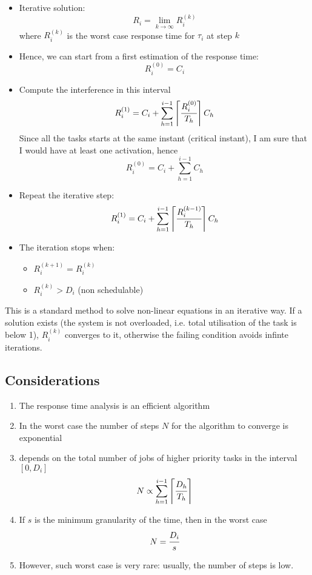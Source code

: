 \begin{itemize}
\item Iterative solution:
\[R_i = \lim_{k\to\infty} R_i^{(k)}\]
where $R_i^{(k)}$ is the worst case response time for $\tau_i$ at step $k$
\item Hence, we can start from a first estimation of the response time:
\[R_{i}^{(0)} = C_i\]
\item Compute the interference in this interval
\[R_{i}^{(1)} = C_i + \sum_{h=1}^{i-1}\left\lceil \cfrac{R_{i}^{(0)}}{T_h} \right\rceil C_h\]
Since all the tasks starts at the same instant (critical instant), I am sure that I would have at least one activation, hence
\[R_i^{(0)} = C_i + \sum_{h=1}^{i-1} C_h\]
\item Repeat the iterative step:
\[R_{i}^{(1)} = C_i + \sum_{h=1}^{i-1}\left\lceil \cfrac{R_{i}^{(k-1)}}{T_h} \right\rceil C_h\]
\item The iteration stops when:
\begin{itemize}
\item $R_i^{(k+1)} = R_i^{(k)}$
\item $R_i^{(k)} > D_i$ (non schedulable)
\end{itemize}
\end{itemize}

This is a standard method to solve non-linear equations in an iterative way. If a solution exists (the system is not overloaded, i.e. total utilisation of the task is below 1), $R_i^{(k)}$ converges to it, otherwise the failing condition avoids infinte iterations.

\subsection{Considerations}
\begin{enumerate}
\item The response time analysis is an efficient algorithm
\item In the worst case the number of steps $N$ for the algorithm to converge is exponential
\item depends on the total number of jobs of higher priority tasks in the interval $[0, D_i]$
\[N \propto \sum_{h=1}^{i-1}\left\lceil \cfrac{D_h}{T_h} \right\rceil\]
\item If $s$ is the minimum granularity of the time, then in the worst case 
\[N = \cfrac{D_i}{s}\]
\item However, such worst case is very rare: usually, the number of steps is low.
\end{enumerate}


